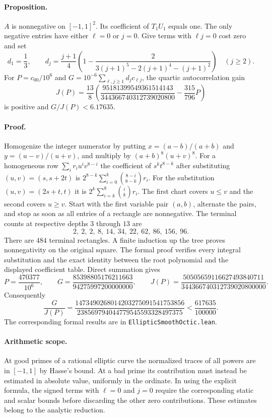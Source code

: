 \documentclass[11pt]{article}
\begin{document}
\paragraph{Proposition.}
$A$ is nonnegative on $[-1,1]^2$. Its coefficient of $T_1U_1$ equals one. The only negative entries have either $\ell=0$ or $j=0$.
Give terms with $\ell j=0$ cost zero and set
\[
d_1=\frac13,\qquad d_j=\frac{j+1}{4}\left(1-\frac2{3(j+1)^5-2(j+1)^4-(j+1)^2}\right)\quad(j\ge2).
\]
For $P=c_{00}/10^6$ and $G=10^{-6}\sum_{\ell,j\ge1}d_j c_{\ell j}$, the quartic autocorrelation gain
\[
J(P)=\frac{13}{8}\left(\frac{95181399549361514143}{344366740312739020800}-\frac{315}{796}P\right)
\]
is positive and $G/J(P)<6.17635$.
\paragraph{Proof.}
Homogenize the integer numerator by putting $x=(a-b)/(a+b)$ and $y=(u-v)/(u+v)$, and multiply by $(a+b)^8(u+v)^8$.
For a homogeneous row $\sum_i r_i u^iv^{8-i}$ the coefficient of $s^kt^{8-k}$ after substituting $(u,v)=(s,s+2t)$ is
$2^{8-k}\sum_{i=0}^k\binom{8-i}{8-k}r_i$.
For the substitution $(u,v)=(2s+t,t)$ it is
$2^k\sum_{i=k}^8\binom{i}{k}r_i$.
The first chart covers $u\le v$ and the second covers $u\ge v$. Start with the first variable pair $(a,b)$, alternate the pairs, and stop as soon as all entries of a rectangle are nonnegative. The terminal counts at respective depths $3$ through $13$ are
\[
2,\ 2,\ 2,\ 8,\ 14,\ 34,\ 22,\ 62,\ 86,\ 156,\ 96 .
\]
There are $484$ terminal rectangles. A finite induction up the tree proves nonnegativity on the original square. The formal proof verifies every integral substitution and the exact identity between the root polynomial and the displayed coefficient table.
Direct summation gives
\[
P=\frac{470377}{10^6},\qquad G=\frac{85398805176211663}{94275997200000000},\qquad
J(P)=\frac{50505659116627493840711}{344366740312739020800000}.
\]
Consequently
\[
\frac{G}{J(P)}
=\frac{1473490268014203275091541753856}{238569794044779545593328497375}<\frac{617635}{100000}.
\]
The corresponding formal results are in \texttt{EllipticSmoothOctic.lean}.
\paragraph{Arithmetic scope.}
At good primes of a rational elliptic curve the normalized traces of all powers are in $[-1,1]$ by Hasse's bound. At a bad prime its contribution must instead be estimated in absolute value, uniformly in the ordinate. In using the explicit formula, the signed terms with $\ell=0$ and $j=0$ require the corresponding static and scalar bounds before discarding the other zero contributions. These estimates belong to the analytic reduction.
\end{document}
